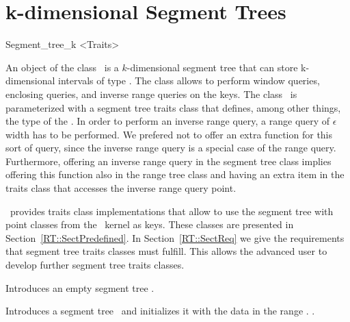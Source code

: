 \section{k-dimensional Segment Trees}
\label{segment-k}


\label{k-segment}
\begin{ccClassTemplate}{Segment_tree_k
        <Traits>}

\ccDefinition


An object of the class  \ccClassName\ is a $k$-dimensional segment tree
that can store k-dimensional intervals  of type . 
The class allows to perform
window queries, enclosing queries, and inverse range queries on the keys.  The class \ccClassName\ is parameterized with
a segment tree traits class  that defines, among other things, 
the type of the . 
In order to perform an inverse range query, a range query of
$\epsilon$ width has to be performed. We prefered not to offer an
extra function for this sort of query, since the inverse range
query is a special case of the range query. Furthermore, offering
an inverse range query in the segment tree class implies offering this
function also in the range tree class and having an extra item in
the traits class that accesses the inverse range query point.


\cgal\ provides traits class implementations that allow to use 
the segment tree with point classes from the \cgal\ kernel as keys.
These classes are presented in Section~\ref{RT::SectPredefined}.  In
Section~\ref{RT::SectReq} we give the requirements that segment tree traits
classes must fulfill. This allows the advanced user to develop further
segment tree traits classes.



\ccTypes




\ccCreation

{Introduces an empty segment tree \ccVar.}

%
{Introduces a segment tree \ccVar\ and initializes it with the data
in the range \ccc{[first, last)}.
\ccPrecond {}.}


\end{ccClassTemplate}
